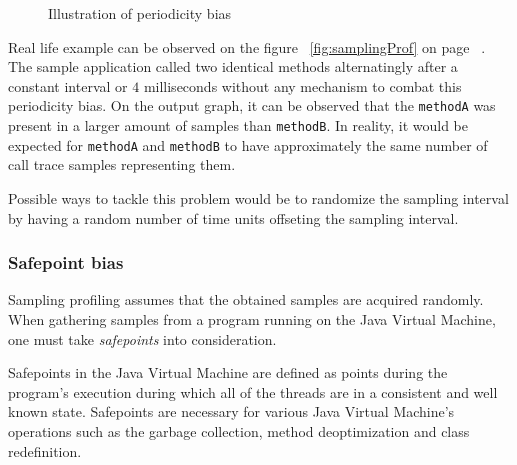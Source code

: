 \documentclass[..thesis.tex]{subfiles}
\begin{document}
\begin{figure}[H]
\centering
{}
\caption{Illustration of periodicity bias}
\label{fig:periodicityBias}
\end{figure}

Real life example can be observed on the figure ~\ref{fig:samplingProf} on page ~\pageref{fig:samplingProf}. The sample application called two identical methods alternatingly after a constant interval or $4$ milliseconds without any mechanism to combat this periodicity bias. On the output graph, it can be observed that the \texttt{methodA} was present in a larger amount of samples than \texttt{methodB}. In reality, it would be expected for \texttt{methodA} and \texttt{methodB} to have approximately the same number of call trace samples representing them.

Possible ways to tackle this problem would be to randomize the sampling interval by having a random number of time units offseting the sampling interval. 
\subsubsection{Safepoint bias}
Sampling profiling assumes that the obtained samples are acquired randomly. When gathering samples from a program running on the Java Virtual Machine, one must take \textit{safepoints} into consideration. 


Safepoints in the Java Virtual Machine are defined as points during the program's execution during which all of the threads are in a consistent and well known state. Safepoints are necessary for various Java Virtual Machine's operations such as the garbage collection, method deoptimization and class redefinition. \cite{hotspot_glossary}
\end{document}
